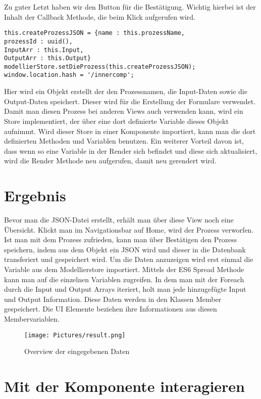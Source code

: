 \documentclass[a4paper,11pt]{scrreprt}
\begin{document}
Zu guter Letzt haben wir den Button für die Bestätigung. 
Wichtig hierbei ist der Inhalt der Callback Methode, die beim Klick aufgerufen wird.
\begin{lstlisting}
this.createProzessJSON = {name : this.prozessName, 
prozessId : uuid(),
InputArr : this.Input, 
OutputArr : this.Output}
modellierStore.setDieProzess(this.createProzessJSON);
window.location.hash = '/innercomp';
\end{lstlisting}
Hier wird ein Objekt erstellt der den Prozessnamen, die Input-Daten sowie die Output-Daten speichert. Dieser wird für die Erstellung der Formulare verwendet.
Damit man diesen Prozess bei anderen Views auch verwenden kann, wird ein Store implementiert, der über eine dort definierte Variable dieses Objekt aufnimmt. 
Wird dieser Store in einer Komponente importiert, kann man die dort definierten Methoden und Variablen benutzen. Ein weiterer Vorteil davon ist, dass wenn so eine Variable in der Render sich befindet und diese sich aktualisiert, wird die Render Methode neu aufgerufen, damit neu gerendert wird. 



\section{Ergebnis}
Bevor man die JSON-Datei erstellt, erhält man über diese View noch eine Übersicht. 
Klickt man im Navigationsbar auf Home, wird der Prozess verworfen. Ist man mit dem Prozess zufrieden, kann man über Bestätigen den Prozess speichern, indem aus dem Objekt ein JSON wird und dieser in die Datenbank transferiert und gespeichert wird. 
Um die Daten anzuzeigen wird erst einmal die Variable aus dem Modellierstore importiert. 
Mittels der ES6 Spread Methode kann man auf die einzelnen Variablen zugreifen. In dem man mit der Foreach durch die Input und Output Arrays iteriert, holt man jede hinzugefügte Input und Output Information. 
Diese Daten werden in den Klassen Member gespeichert. Die UI Elemente beziehen ihre Informationen aus diesen Membervariablen. 

\begin{figure}[ht]
\centering
\texttt{[image: Pictures/result.png]}
\caption{Overview der eingegebenen Daten}
\label{JSON Bildung über Boxen}
\end{figure}
\hfill \break

\section{Mit der Komponente interagieren}
\end{document}
